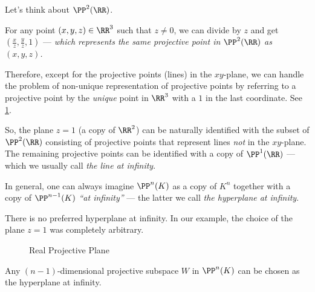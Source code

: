 \begin{exmp}
	Let's think about $\PP^2(\RR)$.

	For any point $(x, y, z) \in \RR^3$ such that $z \neq 0$, we can divide by $z$ and get $\left(\frac{x}{z}, \frac{y}{z}, 1\right)$ --- \emph{which represents the same projective point in $\PP^2(\RR)$ as $(x, y, z)$.}

	Therefore, except for the projective points (lines) in the $xy$-plane, we can handle the problem of non-unique representation of projective points by referring to a projective point by the \emph{unique} point in $\RR^3$ with a $1$ in the last coordinate. See \cref{fig:real-projective-plane}.

	So, the plane $z = 1$ (a copy of $\RR^2$) can be naturally identified with the subset of $\PP^2(\RR)$ consisting of projective points that represent lines \emph{not} in the $xy$-plane.
	The remaining projective points can be identified with a copy of $\PP^1(\RR)$ --- which we usually call \emph{the line at infinity}.

	In general, one can always imagine $\PP^n(K)$ as a copy of $K^n$ together with a copy of $\PP^{n-1}(K)$ \emph{``at infinity''} --- the latter we call \emph{the hyperplane at infinity}.
\end{exmp}

\begin{rem}
	There is no preferred hyperplane at infinity. In our example, the choice of the plane $z = 1$ was completely arbitrary.
\end{rem}

\begin{figure}[ht]
    \centering
    \caption{Real Projective Plane}
    \label{fig:real-projective-plane}
\end{figure}

\begin{lem}
	Any $(n-1)$-dimensional projective subspace $W$ in $\PP^n(K)$ can be chosen as the hyperplane at infinity.
\end{lem}
